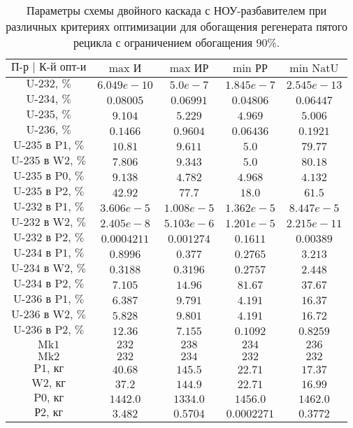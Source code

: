 \begin{table}
\begin{tabular}{ccccc}
    $\text{П-р | К-й опт-и}$ & $\text{max И}$ & $\text{max ИР}$ & $\text{min РР}$ & $\text{min NatU}$\\ \hline
    $\text{U-232, \%}$ & $6.049e-10$ & $5.0e-7$ & $1.845e-7$ & $2.545e-13$\\ \hline
    $\text{U-234, \%}$ & $0.08005$ & $0.06991$ & $0.04806$ & $0.06447$\\ \hline
    $\text{U-235, \%}$ & $9.104$ & $5.229$ & $4.969$ & $5.006$\\ \hline
    $\text{U-236, \%}$ & $0.1466$ & $0.9604$ & $0.06436$ & $0.1921$\\ \hline
    $\text{U-235 в P1, \%}$ & $10.81$ & $9.611$ & $5.0$ & $79.77$\\ \hline
    $\text{U-235 в W2, \%}$ & $7.806$ & $9.343$ & $5.0$ & $80.18$\\ \hline
    $\text{U-235 в P0, \%}$ & $9.138$ & $4.782$ & $4.968$ & $4.132$\\ \hline
    $\text{U-235 в P2, \%}$ & $42.92$ & $77.7$ & $18.0$ & $61.5$\\ \hline
    $\text{U-232 в P1, \%}$ & $3.606e-5$ & $1.008e-5$ & $1.362e-5$ & $8.447e-5$\\ \hline
    $\text{U-232 в W2, \%}$ & $2.405e-8$ & $5.103e-6$ & $1.201e-5$ & $2.215e-11$\\ \hline
    $\text{U-232 в P2, \%}$ & $0.0004211$ & $0.001274$ & $0.1611$ & $0.00389$\\ \hline
    $\text{U-234 в P1, \%}$ & $0.8996$ & $0.377$ & $0.2765$ & $3.213$\\ \hline
    $\text{U-234 в W2, \%}$ & $0.3188$ & $0.3196$ & $0.2757$ & $2.448$\\ \hline
    $\text{U-234 в P2, \%}$ & $7.105$ & $14.96$ & $81.67$ & $37.67$\\ \hline
    $\text{U-236 в P1, \%}$ & $6.387$ & $9.791$ & $4.191$ & $16.37$\\ \hline
    $\text{U-236 в W2, \%}$ & $5.828$ & $9.801$ & $4.191$ & $16.72$\\ \hline
    $\text{U-236 в P2, \%}$ & $12.36$ & $7.155$ & $0.1092$ & $0.8259$\\ \hline
    $\text{Mk1}$ & $232$ & $238$ & $234$ & $236$\\ \hline
    $\text{Mk2}$ & $232$ & $234$ & $232$ & $232$\\ \hline
    $\text{P1, кг}$ & $40.68$ & $145.5$ & $22.71$ & $17.37$\\ \hline
    $\text{W2, кг}$ & $37.2$ & $144.9$ & $22.71$ & $16.99$\\ \hline
    $\text{P0, кг}$ & $1442.0$ & $1334.0$ & $1456.0$ & $1462.0$\\ \hline
    $\text{Р2, кг}$ & $3.482$ & $0.5704$ & $0.0002271$ & $0.3772$
\end{tabular}
\caption{Параметры схемы двойного каскада с НОУ-разбавителем при различных критериях оптимизации для обогащения регенерата пятого рецикла с ограничением обогащения 90\%.{\label{2opt5_90}}}
\end{table}